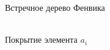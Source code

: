 \begin{figure}
\begin{minipage}[h]{0.47\linewidth}
 Встречное дерево Фенвика \\
\end{minipage}
\hfill
\begin{minipage}[h]{0.47\linewidth}
 \\Покрытие элемента $a_i$
\end{minipage}
\end{figure}
